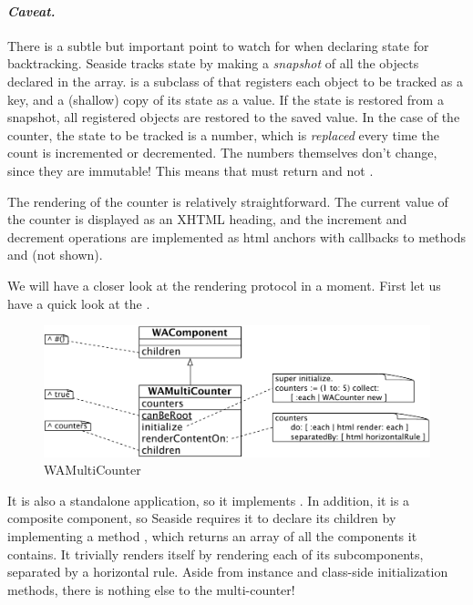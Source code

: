 \documentclass[a4paper,10pt,twoside]{book}
\begin{document}
\paragraph{\emph{Caveat.}}
There is a subtle but important point to watch for when declaring state for backtracking. 
Seaside tracks state by making a \emph{snapshot} of all the objects declared in the  array.
 is a subclass of  that registers each object to be tracked as a key, and a (shallow) copy of its state as a value.
If the state is restored from a snapshot, all registered objects are restored to the saved value.
In the case of the counter, the state to be tracked is a number, which is \emph{replaced} every time the count is incremented or decremented.
The numbers themselves don't change, since they are immutable!
This means that  must return  and not .

The rendering of the counter is relatively straightforward.
The current value of the counter is displayed as an XHTML heading, and the increment and decrement operations are implemented as html anchors with callbacks to methods  and  (not shown).

We will have a closer look at the rendering protocol in a moment.
First let us have a quick look at the .

\begin{figure}[ht]
\begin{center}
\includegraphics[width=\textwidth]{WAMultiCounter}
\caption{WAMultiCounter}
\label{fig:WAMultiCounter}
\end{center}
\end{figure}

It is also a standalone application, so it implements .
In addition, it is a composite component, so Seaside requires it to declare its children by implementing a method , which returns an array of all the components it contains.
It trivially renders itself by rendering each of its subcomponents, separated by a horizontal rule.
Aside from instance and class-side initialization methods, there is nothing else to the multi-counter!
\end{document}
